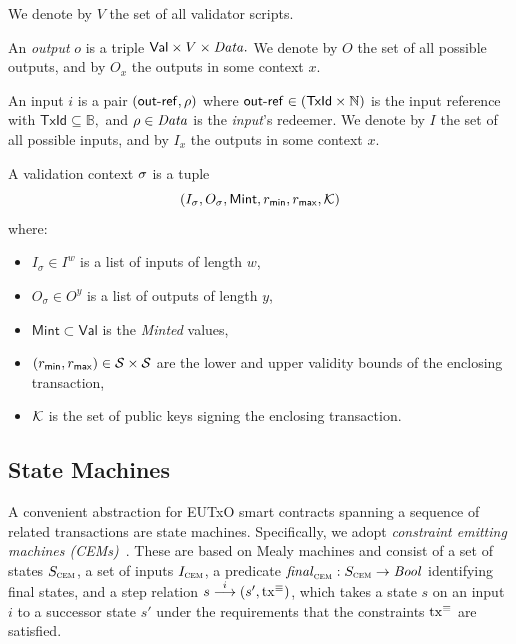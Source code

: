 We denote by $V$ the set of all validator scripts.

\begin{definition}[Outputs]
\label{def:outputs}
An \emph{output} $o$ is a triple $\mathsf{Val} \times V \times \mathit{Data}.$
We denote by $O$ the set of all possible outputs, and by $O_x$ the outputs in some context $x$.
\end{definition}

\begin{definition}[Inputs]
An input $i$ is a pair $(\mathsf{out\textsf{-}{}ref}, \rho)$ where 
$\mathsf{out\textsf{-}{}ref} \in (\mathsf{TxId} \times \mathbb{N})$ is the input reference with $\mathsf{TxId} \subseteq \mathbb{B},$ and $\rho \in \mathit{Data}$ is the \emph{input}'s redeemer.  We denote by $I$ the set of all possible inputs, and by $I_x$ the outputs in some context $x$.
\end{definition}

\begin{definition}

A validation context $\sigma$ is a tuple  
$$(I_\sigma, O_\sigma, \mathsf{Mint}, r_{\mathsf{min}}, r_{\mathsf{max}}, \mathcal K)$$
where:
\begin{itemize}
    \item $I_\sigma \in I^w$ is a list of inputs of length $w$,
    \item $O_\sigma \in O^y$ is a list of outputs of length $y$,
    \item $\mathsf{Mint} \subset \mathsf{Val}$ is the \emph{Minted} values,
    \item $(r_{\mathsf{min}}, r_{\mathsf{max}}) \in \mathcal{S} \times \mathcal{S}$ are the lower and upper validity bounds of the enclosing transaction,
    \item $\mathcal K$ is the set of public keys signing the enclosing transaction.
\end{itemize}

\end{definition}

\subsection{State Machines}\label{sec:cem}
A convenient abstraction for EUTxO smart contracts spanning a sequence
of related transactions are state machines. Specifically, we adopt
\emph{constraint emitting machines (CEMs)}~\cite{eutxo}. These are
based on Mealy machines and consist of a set of states $S_{\textsc{cem}}$, a set
of inputs $I_{\textsc{cem}}$, a predicate \(\mathit{final}_{\textsc{cem}} : S_{\textsc{cem}}\to\mathit{Bool}\)
identifying final states, and a step relation
\({s}\overset{i}\longrightarrow(s', \mathrm{tx}^\equiv)\), which takes a state $s$ on an
input $i$ to a successor state $s'$ under the requirements that the
constraints $\mathrm{tx}^\equiv$ are satisfied.

